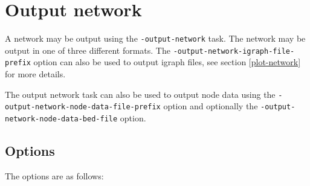 \documentclass[a4paper,12pt]{article}
\newcommand{\code}[1]{{\footnotesize{{\tt #1}}}}
\begin{document}

\section{Output network}
\label{output-network}

A network may be output using the \code{-output-network} task. The network may be output in one of three different formats. The \code{-output-network-igraph-file-prefix} option can also be used to output igraph files, see  section \ref{plot-network} for more details. 

The output network task can also be used to output node data using the \code{-output-network-node-data-file-prefix} option and optionally the \code{-output-network-node-data-bed-file} option. 
\subsection{Options}
\label{output-network-options}

The options are as follows: 
\end{document}
